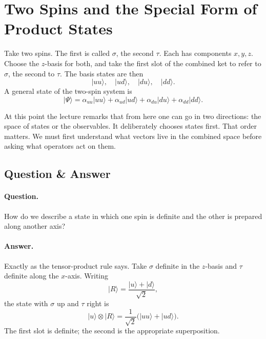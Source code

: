 \section{Two Spins and the Special Form of Product States}

Take two spins. The first is called \(\sigma\), the second \(\tau\). Each has components \(x,y,z\). Choose the \(z\)-basis for both, and take the first slot of the combined ket to refer to \(\sigma\), the second to \(\tau\). The basis states are then
\begin{equation}
|uu\rangle,\quad |ud\rangle,\quad |du\rangle,\quad |dd\rangle.
\end{equation}
A general state of the two-spin system is
\begin{equation}
|\Psi\rangle
=
\alpha_{uu}|uu\rangle
+
\alpha_{ud}|ud\rangle
+
\alpha_{du}|du\rangle
+
\alpha_{dd}|dd\rangle.
\end{equation}

At this point the lecture remarks that from here one can go in two directions: the space of states or the observables. It deliberately chooses states first. That order matters. We must first understand what vectors live in the combined space before asking what operators act on them.

\subsection{Question \& Answer}

\paragraph{Question.} How do we describe a state in which one spin is definite and the other is prepared along another axis?

\paragraph{Answer.} Exactly as the tensor-product rule says. Take \(\sigma\) definite in the \(z\)-basis and \(\tau\) definite along the \(x\)-axis. Writing
\begin{equation}
|R\rangle=\frac{|u\rangle+|d\rangle}{\sqrt2},
\end{equation}
the state with \(\sigma\) up and \(\tau\) right is
\begin{equation}
|u\rangle\otimes |R\rangle
=
\frac{1}{\sqrt2}\bigl(|uu\rangle+|ud\rangle\bigr).
\end{equation}
The first slot is definite; the second is the appropriate superposition.

